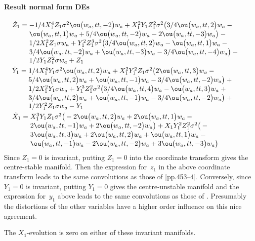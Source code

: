 \paragraph{Result normal form DEs}
\begin{align*}&
\dot Z_{1}=\ParMath{ -1/4 X_{1}^{4} Z_{1} \sigma ^{2} \ou\big(w_{a},tt,-2\big) w_{
a}+X_{1}^{2} Y_{1} Z_{1}^{2} \sigma ^{2} \big(3/4 \ou\big(w_{a},tt,2
\big) w_{a}-\ou\big(w_{a},tt,1\big) w_{a}+5/4 \ou\big(w_{a},tt,-2\big) w
_{a}-2 \ou\big(w_{a},tt,-3\big) w_{a}\big)-1/2 X_{1}^{2} Z_{1} \sigma  w
_{a}+Y_{1}^{2} Z_{1}^{3} \sigma ^{2} \big(3/4 \ou\big(w_{a},tt,2\big) w_
{a}-\ou\big(w_{a},tt,1\big) w_{a}-3/4 \ou\big(w_{a},tt,-2\big) w_{a}+\ou
\big(w_{a},tt,-3\big) w_{a}-3/4 \ou\big(w_{a},tt,-4\big) w_{a}\big)-1/2 
Y_{1} Z_{1}^{2} \sigma  w_{a}+Z_{1}
}\\&
\dot Y_{1}=\ParMath{ 1/4 X_{1}^{4} Y_{1} \sigma ^{2} \ou\big(w_{a},tt,2\big) w_{a}
+X_{1}^{2} Y_{1}^{2} Z_{1} \sigma ^{2} \big(2 \ou\big(w_{a},tt,3\big) w_
{a}-5/4 \ou\big(w_{a},tt,2\big) w_{a}+\ou\big(w_{a},tt,-1\big) w_{a}-3/4
 \ou\big(w_{a},tt,-2\big) w_{a}\big)+1/2 X_{1}^{2} Y_{1} \sigma  w_{a}+Y
_{1}^{3} Z_{1}^{2} \sigma ^{2} \big(3/4 \ou\big(w_{a},tt,4\big) w_{a}-
\ou\big(w_{a},tt,3\big) w_{a}+3/4 \ou\big(w_{a},tt,2\big) w_{a}+\ou\big(
w_{a},tt,-1\big) w_{a}-3/4 \ou\big(w_{a},tt,-2\big) w_{a}\big)+1/2 Y_{1}
^{2} Z_{1} \sigma  w_{a}-Y_{1}
}\\&
\dot X_{1}=\ParMath{ X_{1}^{3} Y_{1} Z_{1} \sigma ^{2} \big(-2 \ou\big(w_{a},tt,2
\big) w_{a}+2 \ou\big(w_{a},tt,1\big) w_{a}-2 \ou\big(w_{a},tt,-1\big) w
_{a}+2 \ou\big(w_{a},tt,-2\big) w_{a}\big)+X_{1} Y_{1}^{2} Z_{1}^{2} 
\sigma ^{2} \big(-3 \ou\big(w_{a},tt,3\big) w_{a}+2 \ou\big(w_{a},tt,2
\big) w_{a}+\ou\big(w_{a},tt,1\big) w_{a}-\ou\big(w_{a},tt,-1\big) w_{a}
-2 \ou\big(w_{a},tt,-2\big) w_{a}+3 \ou\big(w_{a},tt,-3\big) w_{a}\big)
}
\end{align*}
Since \(Z_1=0\) is invariant, putting $Z_1=0$ into the coordinate transform gives the centre-stable manifold.
Then the expression for~$z_1$ in the above coordinate transform leads to the same convolutions as those of \cite{Potzsche2006} [pp.453--4].
Conversely, since \(Y_1=0\) is invariant, putting $Y_1=0$ gives the centre-unstable manifold and the expression for~$y_1$ above leads to the same convolutions as those of \cite{Potzsche2006}.
Presumably the distortions of the other variables have a higher order influence on this nice agreement.

The \(X_1\)-evolution is zero on either of these invariant manifolds.
